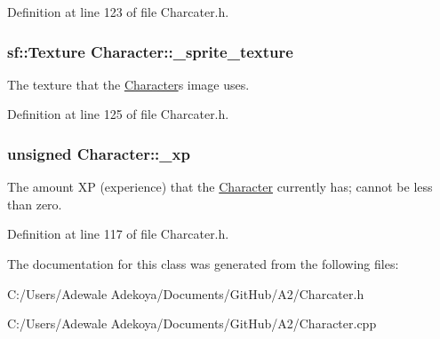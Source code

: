 Definition at line 123 of file Charcater.\+h.

\hypertarget{class_character_aced7e12300ddeaee16c95850e028b10f}{}
\subsubsection[{\+\_\+sprite\+\_\+texture}]{\setlength{\rightskip}{0pt plus 5cm}sf\+::\+Texture Character\+::\+\_\+sprite\+\_\+texture\hspace{0.3cm}{\ttfamily [protected]}}\label{class_character_aced7e12300ddeaee16c95850e028b10f}
The texture that the \hyperlink{class_character}{Character}\textquotesingle{}s image uses. 

Definition at line 125 of file Charcater.\+h.

\hypertarget{class_character_a1155ad0a6f019df868ce25fb18767c3d}{}
\subsubsection[{\+\_\+xp}]{\setlength{\rightskip}{0pt plus 5cm}unsigned Character\+::\+\_\+xp\hspace{0.3cm}{\ttfamily [protected]}}\label{class_character_a1155ad0a6f019df868ce25fb18767c3d}
The amount X\+P (experience) that the \hyperlink{class_character}{Character} currently has; cannot be less than zero. 

Definition at line 117 of file Charcater.\+h.



The documentation for this class was generated from the following files\+:\begin{DoxyCompactItemize}
\item 
C\+:/\+Users/\+Adewale Adekoya/\+Documents/\+Git\+Hub/\+A2/Charcater.\+h\item 
C\+:/\+Users/\+Adewale Adekoya/\+Documents/\+Git\+Hub/\+A2/Character.\+cpp\end{DoxyCompactItemize}
